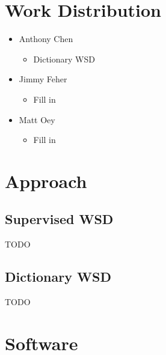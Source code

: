 \documentclass[11pt]{article}
\begin{document}
\lstset{language=Python}
\setlength{\parindent}{0in}
\addtolength{\parskip}{0.1cm}
\setlength{\fboxrule}{.5mm}\setlength{\fboxsep}{1.2mm}
\newlength{\boxlength}\setlength{\boxlength}{\textwidth}
\addtolength{\boxlength}{-4mm}

\begin{center}
\end{center}

\section{Work Distribution}

\begin{itemize}
    \item Anthony Chen 
        \begin{itemize}
            \item Dictionary WSD
        \end{itemize}    
    \item Jimmy Feher
        \begin{itemize}
            \item Fill in
        \end{itemize}  
    \item Matt Oey
        \begin{itemize}
            \item Fill in
        \end{itemize}  
\end{itemize}

\section{Approach}
\subsection{Supervised WSD}
TODO
\subsection{Dictionary WSD}
TODO


\section{Software}
\end{document}
